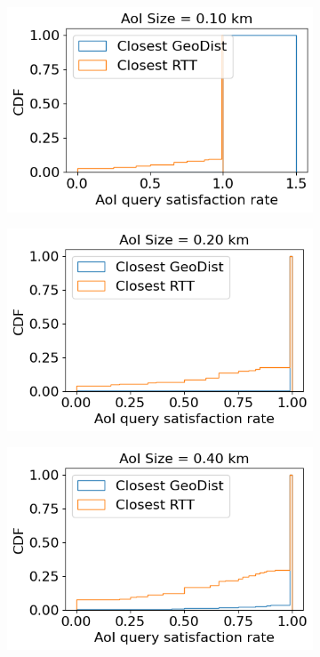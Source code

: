 \begin{figure}
\centering
\begin{subfigure}{0.3\textwidth}
  \centering
  \includegraphics[width=\linewidth]{figures/mechanisms/spatial_ctx_mgmt/aoi_satisfaction_rate_cdf_AOI_0_100_km.png}
  \caption{}
\end{subfigure}%
\begin{subfigure}{0.3\textwidth}
  \centering
  \includegraphics[width=\linewidth]{figures/mechanisms/spatial_ctx_mgmt/aoi_satisfaction_rate_cdf_AOI_0_200_km.png}
  \caption{}
\end{subfigure}
\begin{subfigure}{0.3\textwidth}
  \centering
  \includegraphics[width=\linewidth]{figures/mechanisms/spatial_ctx_mgmt/aoi_satisfaction_rate_cdf_AOI_0_400_km.png}

\end{subfigure}
\end{figure}

